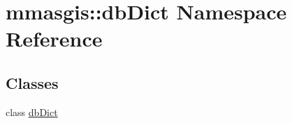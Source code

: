 \hypertarget{namespacemmasgis_1_1dbDict}{
\section{mmasgis::dbDict Namespace Reference}
\label{namespacemmasgis_1_1dbDict}
}
\subsection*{Classes}
\begin{DoxyCompactItemize}
\item 
class \hyperlink{classmmasgis_1_1dbDict_1_1dbDict}{dbDict}
\end{DoxyCompactItemize}
